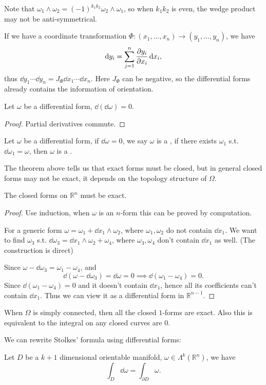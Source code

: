 Note that $\omega_1\wedge \omega_2 = (-1)^{k_1k_2}\omega_2\wedge \omega_1$,
so when $k_1k_2$ is even, the wedge product may not be anti-symmetrical.

If we have a coordinate transformation  $\Phi: (x_1,\dots,x_n)\to (y_1,\dots,y_n)$,
we have
\[
	\mathop{}\!\mathrm{d} y_i = \sum_{j=1}^{n} \frac{\partial y_i}{\partial x_i} \mathop{}\!\mathrm{d} x_i,
\]
thus $\dd y_1\cdots \dd y_n = J_\Phi \dd x_1 \cdots\dd x_n$.
Here $J_\Phi$ can be negative, so the differential forms already contains
the information of orientation.

\begin{theorem}
    Let $\omega$ be a differential form, $\dd (\dd \omega) = 0$.
\end{theorem}
\begin{proof}[Proof]
    Partial derivatives commute.
\end{proof}

\begin{definition}
	Let $\omega$ be a differential form, if $\dd \omega = 0$, we say
	$\omega$ is a , if there exists $\omega_1$ s.t.
	$\dd \omega_1 = \omega$, then $\omega$ is a .
\end{definition}

The theorem above tells us that exact forms must be closed,
but in general closed forms may not be exact, it depends on the topology
structure of $\Omega$.

\begin{theorem}[Poincare]
	The closed forms on $\mathbb{R}^{n}$ must be exact.
\end{theorem}
\begin{proof}[Proof]
	Use induction, when $\omega$ is an $n$-form this can be proved by computation.

	For a generic form $\omega = \omega_1 + \dd x_1\wedge \omega_2$,
	where $\omega_1, \omega_2$ do not contain $\dd x_1$.
	We want to find $\omega_3$ s.t.
	$\dd \omega_3 = \dd x_1\wedge \omega_2 + \omega_4$,
	where $\omega_3, \omega_4$ don't contain $\dd x_1$ as well.
	(The construction is direct)

	Since $\omega - \dd \omega_3 = \omega_1 - \omega_4$,
	and
	\[
		\dd(\omega - \dd\omega_3) = \dd \omega = 0 \implies
		\dd(\omega_1 - \omega_4) = 0.
	\]
	Since $\dd (\omega_1 - \omega_4) = 0$ and it doesn't contain $\dd x_1$,
	hence all its coefficients can't contain $\dd x_1$.
	Thus we can view it as a differential form in $\mathbb{R}^{n-1}$.
\end{proof}
\begin{remark}
    When $\Omega$ is simply connected, then all the closed $1$-forms are exact.
	Also this is equivalent to the integral on any closed curves are $0$.
\end{remark}

We can rewrite Stolkes' formula using differential forms:
\begin{theorem}
    Let $D$ be a $k+1$ dimensional orientable manifold,
	$\omega \in \Lambda^k(\mathbb{R}^{n})$, we have
	\[
	\int_D \dd \omega = \int_{\partial D} \omega.
	\]
\end{theorem}
